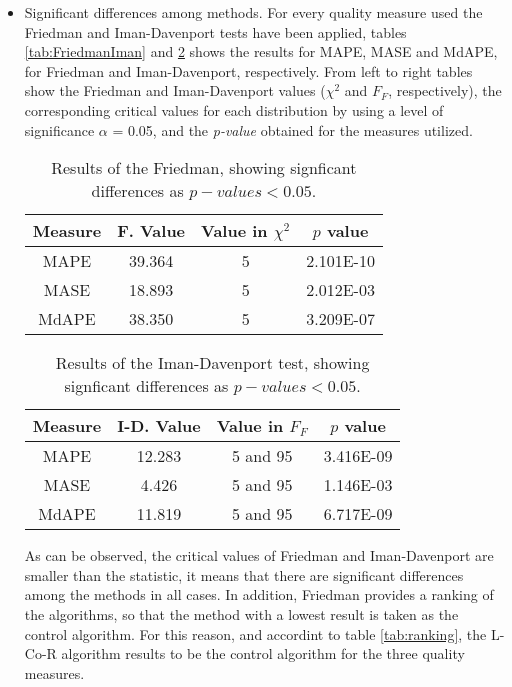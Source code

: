 \documentclass[a4paper,twoside]{article}
\newcommand{\metodo}{L-Co-R}
\begin{document}
\begin{itemize}
  \item Significant differences among methods. For every quality
    measure used the Friedman and Iman-Davenport tests have been
    applied, tables \ref{tab:FriedmanIman} and
    \ref{tab:ImanDavenport} %
  shows the results for MAPE, MASE and MdAPE, for Friedman and Iman-Davenport, respectively. From left to right tables show the Friedman and Iman-Davenport values ($\chi^2$ and $F_F$, respectively), the corresponding critical values for each distribution by using a level of significance $\alpha$ = 0.05, and the \emph{p-value} obtained for the measures utilized.

    \begin{table}[h]
        \caption{Results of the Friedman, showing signficant differences as $p-values<0.05$.}
        \label{tab:Friedman}
        \centering
        \begin{tabular}{|c|c|c|c|}
         \hline Measure & F. Value & Value in $\chi^2$ & $p$ value \\
         \hline MAPE	&	39.364	&	5	&	2.101E-10	\\
         \hline MASE	&	18.893	&	5	&	2.012E-03	\\
         \hline MdAPE	&	38.350	&	5	&	3.209E-07	\\
         \hline
        \end{tabular}
    \end{table}

    \begin{table}[h]
        \caption{Results of the Iman-Davenport test, showing signficant differences as $p-values<0.05$. }
        \label{tab:ImanDavenport}
        \centering
        \begin{tabular}{|c|c|c|c|}
         \hline Measure &  I-D. Value & Value in $F_F$ & $p$ value \\
         \hline MAPE	&	12.283	&	5 and 95	&	3.416E-09\\
         \hline MASE	&	4.426	&	5 and 95	&	1.146E-03\\
         \hline MdAPE	&	11.819	&	5 and 95	&	6.717E-09\\
         \hline
        \end{tabular}
    \end{table}
      

    As can be observed, the critical values of Friedman and Iman-Davenport are smaller than the statistic, it means that there are significant differences among the methods in all cases.
    In addition, Friedman provides a ranking of the algorithms, so that the method with a lowest result is taken as the control algorithm. For this reason, and accordint to table \ref{tab:ranking}, the {\metodo} algorithm results to be the control algorithm for the three quality measures.


\end{itemize}
\end{document}
